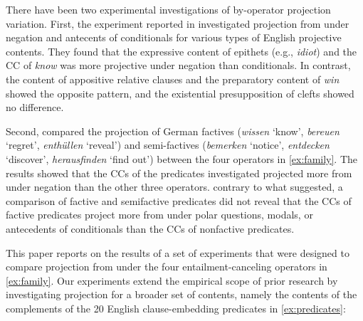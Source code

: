 \documentclass[a4paper,12pt,twoside]{article}
\newcommand{\poscite}[1]{\citeauthor{#1}'s \citeyear{#1}}
\begin{document}
    There have been two experimental investigations of by-operator projection variation. First, the experiment reported in \citet{smith_relationship_2014} investigated projection from under negation and antecents of conditionals for various types of English projective contents. They found that the expressive content of epithets (e.g., \textit{idiot}) and the CC of \textit{know} was more projective under negation than conditionals. In contrast, the content of appositive relative clauses and the preparatory content of \textit{win} showed the opposite pattern, and the existential presupposition of clefts showed no difference. %
    
    Second, \citet{sieker_projective_2022}  compared the projection of German factives (\textit{wissen} `know', \textit{bereuen} `regret', \textit{ent\-hüllen} `reveal') and semi-factives (\textit{bemerken} `notice', \textit{entdecken} `discover', \textit{herausfinden} `find out') between the four operators in \ref{ex:family}. The results showed that the CCs of the predicates investigated projected more from under negation than the other three operators. contrary to what \citealt{karttunen_observations_1971} suggested, a comparison of factive and semifactive predicates did not reveal that the CCs of factive predicates project more from under polar questions, modals, or antecedents of conditionals than the CCs of nonfactive predicates.


    This paper reports on the results of a set of experiments that were designed to compare projection from under the four entailment-canceling operators in \ref{ex:family}. Our experiments extend the empirical scope of prior research by investigating projection for a broader set of contents, namely the contents of the complements of the 20 English clause-embedding predicates in \ref{ex:predicates}:
    
\end{document}
